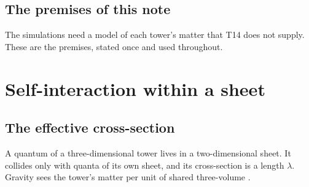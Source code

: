 \documentclass[11pt]{article}
\theoremstyle{definition}
\theoremstyle{plain}
\begin{document}
\subsection*{The premises of this note}
\label{c:note.simulations.setting-premises-note}
The simulations need a model of each tower's matter that T14 does not supply. These are the premises, stated once and used throughout.

\section{Self-interaction within a sheet}

\subsection*{The effective cross-section}
\label{c:note.simulations.setting-effective-cross-section}
A quantum of a three-dimensional tower lives in a two-dimensional sheet. It collides only with quanta of its own sheet, and its cross-section is a length $\lambda$. Gravity sees the tower's matter per unit of shared three-volume \cite[Lem.~6.1]{ButlerT14}.
\end{document}
